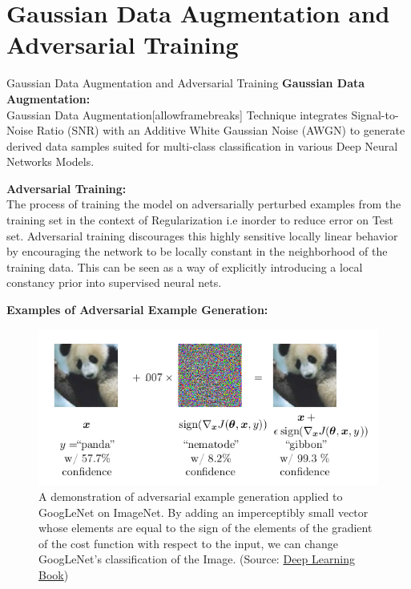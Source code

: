 \documentclass[8pt]{beamer}
\begin{document}
\section{Gaussian Data Augmentation and Adversarial Training}
\begin{frame}[allowframebreaks]{Gaussian Data Augmentation and Adversarial Training}
\textbf{Gaussian Data Augmentation:}\\
\qquad Gaussian Data Augmentation[allowframebreaks] Technique integrates Signal-to-Noise Ratio (SNR) with an Additive White Gaussian Noise (AWGN) to generate derived data samples suited for multi-class classification in various Deep Neural Networks Models. 

\vspace{0.2in}

\textbf{Adversarial Training:}\\
\qquad The process of training the model on adversarially perturbed examples from the training set in the context of Regularization i.e inorder to reduce error on Test set. Adversarial training discourages this highly sensitive locally linear behavior by encouraging the network to be locally constant in the neighborhood of the training data. This can be seen as a way of explicitly introducing a local constancy prior into supervised neural nets.

\framebreak

\textbf{Examples of Adversarial Example Generation:}\\
\begin{figure}
    \centering
    \includegraphics[scale=0.4]{../Images/Adversarial Training.png}
    \caption{A demonstration of adversarial example generation applied to GoogLeNet on ImageNet. By adding an imperceptibly small vector whose elements are equal to the sign of the elements of the gradient of the cost function with respect to the input, we can change GoogLeNet’s classification of the Image. (Source: \href{https://www.deeplearningbook.org/}{Deep Learning Book})}
    \label{fig:my_label}
\end{figure}
\end{frame}
\end{document}
